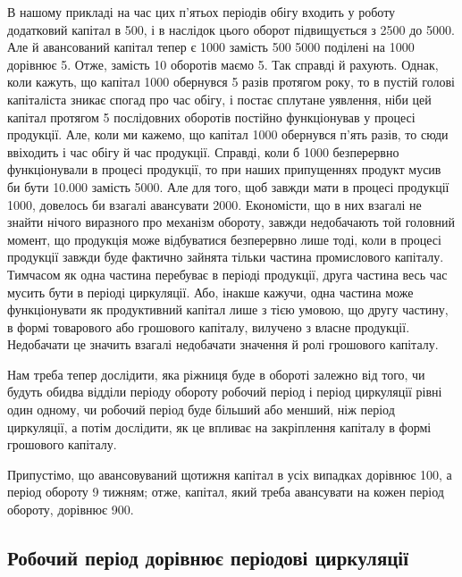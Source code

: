 В нашому прикладі на час цих п’ятьох періодів обігу входить у роботу
додатковий капітал в 500, і в наслідок цього оборот підвищується
з 2500 до 5000. Але й авансований капітал
тепер є 1000 замість 500 5000 поділені на 1000
дорівнює 5. Отже, замість 10 оборотів маємо 5. Так справді й рахують.
Однак, коли кажуть, що капітал 1000 обернувся 5 разів протягом
року, то в пустій голові капіталіста зникає спогад про час обігу,
і постає сплутане уявлення, ніби цей капітал протягом 5 послідовних
оборотів постійно функціонував у процесі продукції. Але, коли ми кажемо,
що капітал 1000 обернувся п’ять разів, то сюди ввіходить
і час обігу й час продукції. Справді, коли б 1000 безперервно
функціонували в процесі продукції, то при наших припущеннях продукт
мусив би бути \num{10.000} замість 5000. Але для того, щоб завжди
мати в процесі продукції 1000, довелось би взагалі авансувати
2000. Економісти, що в них взагалі не знайти нічого виразного
про механізм обороту, завжди недобачають той головний момент, що
продукція може відбуватися безперервно лише тоді, коли в процесі продукції
завжди буде фактично зайнята тільки частина промислового капіталу.
Тимчасом як одна частина перебуває в періоді продукції, друга частина
весь час мусить бути в періоді циркуляції. Або, інакше кажучи, одна
частина може функціонувати як продуктивний капітал лише з тією умовою,
що другу частину, в формі товарового або грошового капіталу, вилучено
з власне продукції. Недобачати це \textendash{} значить взагалі недобачати значення
й ролі грошового капіталу.

Нам треба тепер дослідити, яка ріжниця буде в обороті залежно від
того, чи будуть обидва відділи періоду обороту \textendash{} робочий період і період
циркуляції \textendash{} рівні один одному, чи робочий період буде більший
або менший, ніж період циркуляції, а потім дослідити, як це впливає на
закріплення капіталу в формі грошового капіталу.

Припустімо, що авансовуваний щотижня капітал в усіх випадках дорівнює
100, а період обороту \textendash{} 9 тижням; отже, капітал, який
треба авансувати на кожен період обороту, дорівнює 900.

\subsection{Робочий період дорівнює періодові циркуляції}

